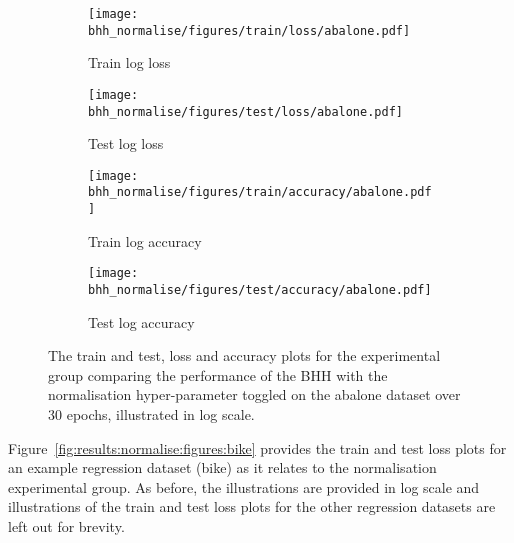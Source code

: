 \begin{figure}[htbp]
      \begin{subfigure}{0.5\textwidth}
            \centering
            \texttt{[image: bhh\_normalise/figures/train/loss/abalone.pdf]}
            \caption{Train log loss}
            \label{fig:results:normalise:figures:loss:train:abalone}
      \end{subfigure}
      \begin{subfigure}{0.5\textwidth}
            \centering
            \texttt{[image: bhh\_normalise/figures/test/loss/abalone.pdf]}
            \caption{Test log loss}
            \label{fig:results:normalise:figures:loss:test:abalone}
      \end{subfigure}
      \par\bigskip
      \begin{subfigure}{0.5\textwidth}
            \centering
            \texttt{[image: bhh\_normalise/figures/train/accuracy/abalone.pdf]}
            \caption{Train log accuracy}
            \label{fig:results:normalise:figures:accuracy:train:abalone}
      \end{subfigure}
      \begin{subfigure}{0.5\textwidth}
            \centering
            \texttt{[image: bhh\_normalise/figures/test/accuracy/abalone.pdf]}
            \caption{Test log accuracy}
            \label{fig:results:normalise:figures:accuracy:test:abalone}
      \end{subfigure}
      \par\bigskip
      \caption{The train and test, loss and accuracy plots for the experimental group comparing the performance of the \acs{BHH} with the normalisation hyper-parameter toggled on the abalone dataset over 30 epochs, illustrated in log scale.}
      \label{fig:results:normalise:figures:abalone}
\end{figure}


Figure~\ref{fig:results:normalise:figures:bike} provides the train and test loss plots for an example regression dataset (bike) as it relates to the normalisation experimental group. As before, the illustrations are provided in log scale and illustrations of the train and test loss plots for the other regression datasets are left out for brevity.


